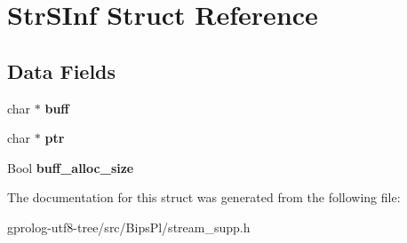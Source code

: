 \hypertarget{structStrSInf}{}\section{Str\+S\+Inf Struct Reference}
\label{structStrSInf}
\subsection*{Data Fields}
\begin{DoxyCompactItemize}
\item 
char $\ast$ {\bfseries buff}\hypertarget{structStrSInf_aeb057f9f00adf6340a825b3a5f5d2f85}{}\label{structStrSInf_aeb057f9f00adf6340a825b3a5f5d2f85}

\item 
char $\ast$ {\bfseries ptr}\hypertarget{structStrSInf_a68da0c71b6666b73881d68d364de63f2}{}\label{structStrSInf_a68da0c71b6666b73881d68d364de63f2}

\item 
Bool {\bfseries buff\+\_\+alloc\+\_\+size}\hypertarget{structStrSInf_af4eb3705492f95c32af035b64b070958}{}\label{structStrSInf_af4eb3705492f95c32af035b64b070958}

\end{DoxyCompactItemize}


The documentation for this struct was generated from the following file\+:\begin{DoxyCompactItemize}
\item 
gprolog-\/utf8-\/tree/src/\+Bips\+Pl/stream\+\_\+supp.\+h\end{DoxyCompactItemize}

